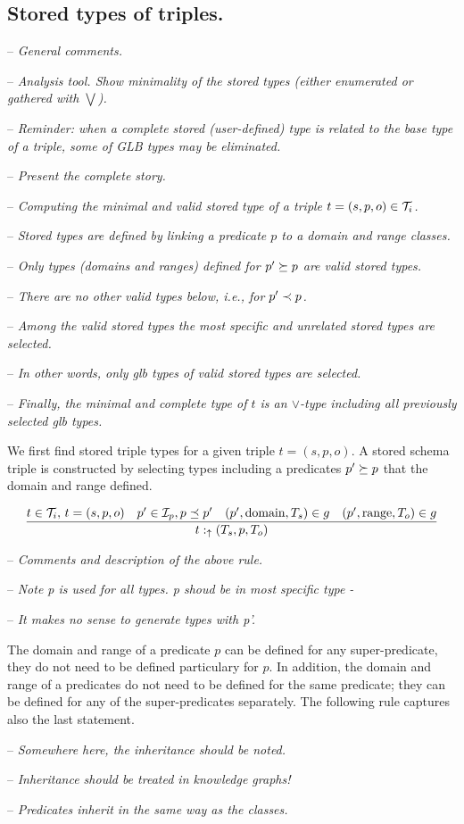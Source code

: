 \documentclass[runningheads]{llncs}
\newcommand{\uarr}{\uparrow}
\newcommand{\I}{{\cal I}}
\newcommand{\T}{{\cal T}}
\newcommand{\nl}{\hfill\break}
\newcommand{\notes}[1]{\noindent\begin{small}-- \emph{#1}\\\end{small}}
\begin{document}
\subsection{Stored types of triples.}\nl

\notes{General comments.}
\notes{Analysis tool. Show minimality of the stored types (either enumerated or gathered with $\bigvee$).}
\notes{\emph{Reminder:} when a complete stored (user-defined) type is related to the base type of a triple, some of GLB types may be eliminated.}

\notes{Present the complete story.}
\notes{Computing the minimal and valid stored type of a triple $t=(s,p,o)\in\T_i$.}
\notes{Stored types are defined by linking a predicate $p$ to a domain and range classes.}
\notes{Only types (domains and ranges) defined for $p'\succeq\/p$ are valid stored types.}
\notes{There are no other valid types below, i.e., for $p'\prec\/p$.}
\notes{Among the valid stored types the most specific and unrelated stored types are selected.}
\notes{In other words, only glb types of valid stored types are selected.}
\notes{Finally, the minimal and complete type of $t$ is an $\lor$-type including all previously selected glb types.}

We first find stored triple types for a given triple $t=(s,p,o)$. A
stored schema triple is constructed by selecting types including a
predicates $p'\succeq\/p$ that  the domain and range defined.

\begin{equation}
\label{rul:3-stored}
\dfrac{t\in\T_i,\, t=(s,p,o)\quad p'\in\I_p, p\preceq\/p'\quad (p',\text{domain},T_s)\in\/g\quad (p',\text{range},T_o)\in\/g}
      {t:_\uarr(T_s,p,T_o)}
\end{equation}


\medskip
\notes{Comments and description of the above rule.}
\notes{Note p is used for all types. p shoud be in most specific type -}
\notes{It makes no sense to generate types with p'.} 

The domain and range of a predicate $p$ can be defined for any
super-predicate, they do not need to be defined particulary for
$p$. In addition, the domain and range of a predicates do not need to
be defined for the same predicate; they can be defined for any of the
super-predicates separately. The following rule captures also the last
statement.

\medskip
\notes{Somewhere here, the inheritance should be noted.}
\notes{Inheritance should be treated in knowledge graphs!}
\notes{Predicates inherit in the same way as the classes.}
\end{document}
